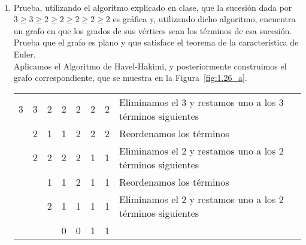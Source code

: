 \begin{ejercicio}\label{ej:1.26}~
    \begin{enumerate}
        \item\label{ej:1.26a}
        Prueba, utilizando el algoritmo explicado en clase, que la sucesión dada por $3 \geq 3 \geq 2 \geq 2 \geq 2 \geq 2 \geq 2$ es gráfica y, utilizando dicho algoritmo, encuentra un grafo en que los grados de sus vértices sean los términos de esa sucesión. Prueba que el grafo es plano y que satisface el teorema de la característica de Euler.\\
        
        Aplicamos el Algoritmo de Havel-Hakimi, y posteriormente construimos el grafo correspondiente, que se muestra en la Figura~\ref{fig:1.26_a}.
        \begin{table}[H]
            \centering
            \begin{tabular}{ccccccc|l}
                3 & 3 & 2 & 2 & 2 & 2 & 2 & Eliminamos el 3 y restamos uno a los 3 términos siguientes\\
                  & 2 & 1 & 1 & 2 & 2 & 2 & Reordenamos los términos\\
                  & 2 & 2 & 2 & 2 & 1 & 1 & Eliminamos el 2 y restamos uno a los 2 términos siguientes\\
                  &   & 1 & 1 & 2 & 1 & 1 & Reordenamos los términos\\
                  &   & 2 & 1 & 1 & 1 & 1 & Eliminamos el 2 y restamos uno a los 2 términos siguientes\\
                  &   &   & 0 & 0 & 1 & 1 &
            \end{tabular}
        \end{table}

        \begin{figure}
            \centering
\end{figure}
\end{enumerate}
\end{ejercicio}
